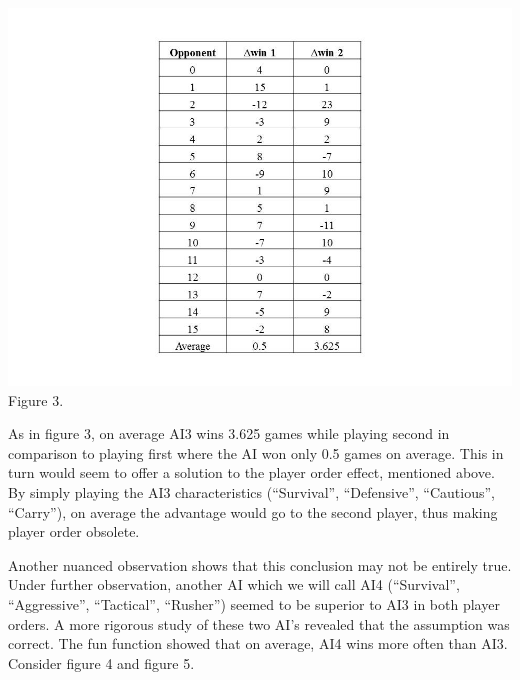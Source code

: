 \documentclass[12pt]{article}  %
\begin{document}
\begin{center}
\includegraphics[scale=0.6]{images/Figure_3.jpg}\\
{\footnotesize Figure 3.}
\end{center}


As in figure 3, on average AI3 wins 3.625 games while playing second in comparison to playing first where the AI won only 0.5 games on average. This in turn would seem to offer a solution to the player order effect, mentioned above. By simply playing the AI3 characteristics (“Survival”, “Defensive”, “Cautious”, “Carry”), on average the advantage would go to the second player, thus making player order obsolete. 


Another nuanced observation shows that this conclusion may not be entirely true. Under further observation, another AI which we will call AI4 (“Survival”, “Aggressive”, “Tactical”, “Rusher”) seemed to be superior to AI3 in both player orders. A more rigorous study of these two AI’s revealed that the assumption was correct. The fun function showed that on average, AI4 wins more often than AI3. Consider figure 4 and figure 5. 
\end{document}
